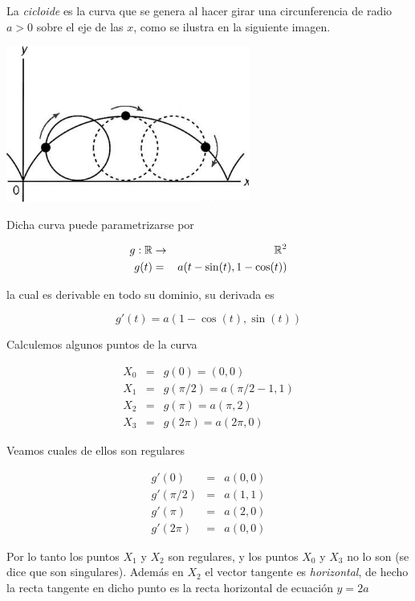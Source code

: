 \begin{example}
La \emph{cicloide} es la curva que se genera al hacer girar una circunferencia de radio $a>0$ sobre el eje de las $x$, como se ilustra en la siguiente imagen.

\begin{center}
\includegraphics[width=8cm]{images/04_analisis2/cicloide.png}
\end{center}

Dicha curva puede parametrizarse por

\begin{eqnarray*} g : \mathbb{R} &\to& \mathbb{R}^2 \\
g(t) &=& a ( t - \sin(t) , 1 - \cos(t) ) \end{eqnarray*}

la cual es derivable en todo su dominio, su derivada es

$$ g'(t) =  a ( 1 - \cos(t), \sin(t) ) $$

Calculemos algunos puntos de la curva

\begin{eqnarray*}X_0 &=& g(0) = (0, 0) \\
X_1 &=& g(\pi/2) = a (\pi/2 - 1, 1) \\
X_2 &=& g(\pi) = a ( \pi, 2) \\
X_3 &=& g(2\pi) = a ( 2\pi, 0) \end{eqnarray*}

Veamos cuales de ellos son regulares

\begin{eqnarray*} g'(0) &=& a ( 0, 0 ) \\
g'(\pi/2) &=& a (1, 1) \\
g'(\pi) &=& a (2, 0) \\
g'(2\pi) &=& a (0, 0) \end{eqnarray*}

Por lo tanto los puntos $ X_1$ y $X_2$ son regulares, y los puntos $ X_0$ y $X_3$ no lo son (se dice que son singulares).  Además en $X_2$ el vector tangente es \emph{horizontal}, de hecho la recta tangente en dicho punto es la recta horizontal de ecuación $y = 2a$
\end{example}


